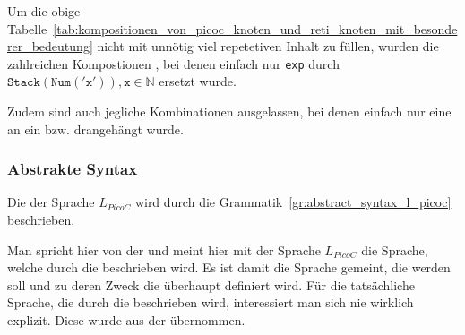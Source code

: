 \begin{Special_Paragraph}
  Um die obige Tabelle~\ref{tab:kompositionen_von_picoc_knoten_und_reti_knoten_mit_besonderer_bedeutung} nicht mit unnötig viel repetetiven Inhalt zu füllen, wurden die zahlreichen Kompostionen , bei denen einfach nur \verb|exp| durch $\mathtt{Stack(Num('x')), x}\in\mathbb{N}$ ersetzt wurde.

  Zudem sind auch jegliche Kombinationen ausgelassen, bei denen einfach nur eine  an ein  bzw.   drangehängt wurde.
\end{Special_Paragraph}

\subsubsection{Abstrakte Syntax}
\label{sec:abstrakte_syntax}

Die  der Sprache $L_{PicoC}$ wird durch die Grammatik~\ref{gr:abstract_syntax_l_picoc} beschrieben.

\begin{grammar}
  \toprule
  \commentsecond
  \midrule
  \arith
  \midrule
  \logic
  \midrule
  \assign
  \midrule
  \pntr
  \midrule
  \arraysecond
  \midrule
  \struct
  \midrule
  \ifelse
  \midrule
  \loopsecond
  \midrule
  \fun
  \midrule
  \file
  \bottomrule
\end{grammar}

\begin{Special_Paragraph}
  Man spricht hier von der  und meint hier mit der Sprache $L_{PicoC}$  die Sprache, welche durch die  beschrieben wird. Es ist damit  die Sprache gemeint, die  werden soll und zu deren Zweck die  überhaupt definiert wird. Für die tatsächliche Sprache, die durch die  beschrieben wird, interessiert man sich nie wirklich explizit. Diese  wurde aus der  \cite{g_siek_course_2022} übernommen.
\end{Special_Paragraph}


